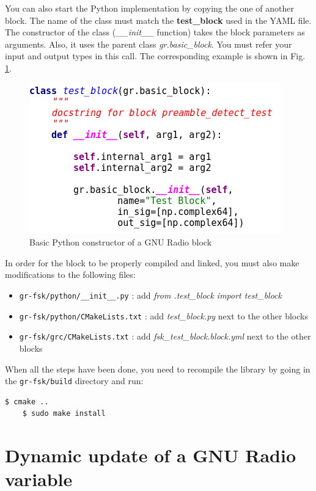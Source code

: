 You can also start the Python implementation by copying the one of another block. The name of the class must match the \textbf{test\_block} used in the YAML file. The constructor of the class (\textit{\_\_init\_\_} function) takes the block parameters as arguments. Also, it uses the parent class \textit{gr.basic\_block}. You must refer your input and output types in this call. The corresponding example is shown in Fig. \ref{fig:Basic_python}.

\begin{figure}[h]
    \centering
    \includegraphics[scale=0.75, left]{figures/Basic_python.png}
    \caption{Basic Python constructor of a GNU Radio block}
    \label{fig:Basic_python}
\end{figure}

In order for the block to be properly compiled and linked, you must also make modifications to the following files:

\begin{itemize}
    \item \texttt{gr-fsk/python/\_\_init\_\_.py}  : add \textit{from .test\_block import test\_block}
    \item \texttt{gr-fsk/python/CMakeLists.txt}  : add \textit{test\_block.py} next to the other blocks
    \item \texttt{gr-fsk/grc/CMakeLists.txt}  : add \textit{fsk\_test\_block.block.yml} next to the other blocks
\end{itemize}

When all the steps have been done, you need to recompile the library by going in the \texttt{gr-fsk/build} directory and run:
\begin{lstlisting}[language=bash]
    $ cmake ..
    $ sudo make install
\end{lstlisting}



\section{Dynamic update of a GNU Radio variable}

